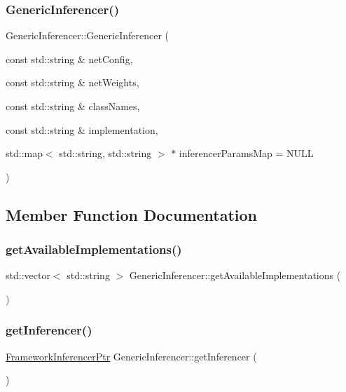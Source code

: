 \subsubsection{\texorpdfstring{Generic\+Inferencer()}{GenericInferencer()}}
{\footnotesize\ttfamily Generic\+Inferencer\+::\+Generic\+Inferencer (\begin{DoxyParamCaption}\item[{const std\+::string \&}]{net\+Config,  }\item[{const std\+::string \&}]{net\+Weights,  }\item[{const std\+::string \&}]{class\+Names,  }\item[{const std\+::string \&}]{implementation,  }\item[{std\+::map$<$ std\+::string, std\+::string $>$ $\ast$}]{inferencer\+Params\+Map = {\ttfamily NULL} }\end{DoxyParamCaption})}



\subsection{Member Function Documentation}
\mbox{\label{class_generic_inferencer_a40f6285002820780d626e80a2524a494}} 
\subsubsection{\texorpdfstring{get\+Available\+Implementations()}{getAvailableImplementations()}}
{\footnotesize\ttfamily std\+::vector$<$ std\+::string $>$ Generic\+Inferencer\+::get\+Available\+Implementations (\begin{DoxyParamCaption}{ }\end{DoxyParamCaption})\hspace{0.3cm}{\ttfamily [static]}}

\mbox{\label{class_generic_inferencer_a786e55caa6a7329b8f5d1011372b8942}} 
\subsubsection{\texorpdfstring{get\+Inferencer()}{getInferencer()}}
{\footnotesize\ttfamily \hyperlink{_framework_inferencer_8h_a7b59ebc4b080d1be0d1a6240703011f2}{Framework\+Inferencer\+Ptr} Generic\+Inferencer\+::get\+Inferencer (\begin{DoxyParamCaption}{ }\end{DoxyParamCaption})}




